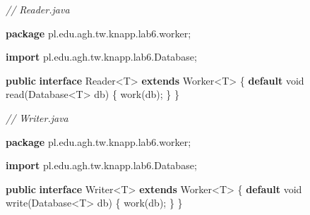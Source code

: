 \documentclass[11pt]{article}
\newenvironment{Shaded}{}{}
\newcommand{\KeywordTok}[1]{\textcolor[rgb]{0.00,0.44,0.13}{\textbf{{#1}}}}
\newcommand{\DataTypeTok}[1]{\textcolor[rgb]{0.56,0.13,0.00}{{#1}}}
\newcommand{\CommentTok}[1]{\textcolor[rgb]{0.38,0.63,0.69}{\textit{{#1}}}}
\newcommand{\FunctionTok}[1]{\textcolor[rgb]{0.02,0.16,0.49}{{#1}}}
\newcommand{\NormalTok}[1]{{#1}}
\newcommand{\ImportTok}[1]{{#1}}
\newcommand{\OperatorTok}[1]{\textcolor[rgb]{0.40,0.40,0.40}{{#1}}}
\newcommand{\BuiltInTok}[1]{{#1}}
\begin{document}
\begin{Shaded}
\begin{Highlighting}[]
\CommentTok{// Reader.java}

\KeywordTok{package}\ImportTok{ pl}\OperatorTok{.}\ImportTok{edu}\OperatorTok{.}\ImportTok{agh}\OperatorTok{.}\ImportTok{tw}\OperatorTok{.}\ImportTok{knapp}\OperatorTok{.}\ImportTok{lab6}\OperatorTok{.}\ImportTok{worker}\OperatorTok{;}

\KeywordTok{import} \ImportTok{pl}\OperatorTok{.}\ImportTok{edu}\OperatorTok{.}\ImportTok{agh}\OperatorTok{.}\ImportTok{tw}\OperatorTok{.}\ImportTok{knapp}\OperatorTok{.}\ImportTok{lab6}\OperatorTok{.}\ImportTok{Database}\OperatorTok{;}

\KeywordTok{public} \KeywordTok{interface} \BuiltInTok{Reader}\OperatorTok{\textless{}}\NormalTok{T}\OperatorTok{\textgreater{}} \KeywordTok{extends}\NormalTok{ Worker}\OperatorTok{\textless{}}\NormalTok{T}\OperatorTok{\textgreater{}} \OperatorTok{\{}
    \KeywordTok{default} \DataTypeTok{void} \FunctionTok{read}\OperatorTok{(}\NormalTok{Database}\OperatorTok{\textless{}}\NormalTok{T}\OperatorTok{\textgreater{}}\NormalTok{ db}\OperatorTok{)} \OperatorTok{\{}
        \FunctionTok{work}\OperatorTok{(}\NormalTok{db}\OperatorTok{);}
    \OperatorTok{\}}
\OperatorTok{\}}
\end{Highlighting}
\end{Shaded}

\begin{Shaded}
\begin{Highlighting}[]
\CommentTok{// Writer.java}

\KeywordTok{package}\ImportTok{ pl}\OperatorTok{.}\ImportTok{edu}\OperatorTok{.}\ImportTok{agh}\OperatorTok{.}\ImportTok{tw}\OperatorTok{.}\ImportTok{knapp}\OperatorTok{.}\ImportTok{lab6}\OperatorTok{.}\ImportTok{worker}\OperatorTok{;}

\KeywordTok{import} \ImportTok{pl}\OperatorTok{.}\ImportTok{edu}\OperatorTok{.}\ImportTok{agh}\OperatorTok{.}\ImportTok{tw}\OperatorTok{.}\ImportTok{knapp}\OperatorTok{.}\ImportTok{lab6}\OperatorTok{.}\ImportTok{Database}\OperatorTok{;}

\KeywordTok{public} \KeywordTok{interface} \BuiltInTok{Writer}\OperatorTok{\textless{}}\NormalTok{T}\OperatorTok{\textgreater{}} \KeywordTok{extends}\NormalTok{ Worker}\OperatorTok{\textless{}}\NormalTok{T}\OperatorTok{\textgreater{}} \OperatorTok{\{}
    \KeywordTok{default} \DataTypeTok{void} \FunctionTok{write}\OperatorTok{(}\NormalTok{Database}\OperatorTok{\textless{}}\NormalTok{T}\OperatorTok{\textgreater{}}\NormalTok{ db}\OperatorTok{)} \OperatorTok{\{}
        \FunctionTok{work}\OperatorTok{(}\NormalTok{db}\OperatorTok{);}
    \OperatorTok{\}}
\OperatorTok{\}}
\end{Highlighting}
\end{Shaded}
\end{document}
